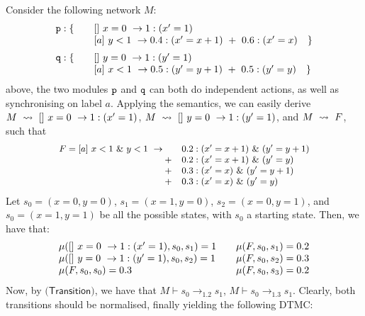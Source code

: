 \begin{example}
  Consider the following network $M$:
  \begin{displaymath}
    \begin{array}{llll}
      \role{p}: \{ & \quad \commandBase {}{x=0} {1:(x'=1)}\\
                   & \quad \commandBase {a}{y<1} {0.4: (x'=x+1)\ +\ 0.6: (x'=x)}\quad \}\\[2mm]
      \role{q}: \{ & \quad \commandBase {}{y=0} {1:(y'=1)}\\
                   & \quad \commandBase {a}{x<1} {0.5: (y'=y+1)\ +\ 0.5: (y'=y)}\quad \}\\
    \end{array}
  \end{displaymath}
  above, the two modules $\mathtt{p}$ and $\mathtt{q}$ can both do
  independent actions, as well as synchronising on label $a$. Applying
  the semantics, we can easily derive
  $M\ \stackrel{}{\rightsquigarrow}\ []\ x=0\ \rightarrow 1:(x'=1)$,
  $M\ \stackrel{}{\rightsquigarrow}\ []\ y=0\ \rightarrow 1:(y'=1)$, and $M\ \stackrel{}{\rightsquigarrow}\ F$,
  such that
  \begin{displaymath}\small
    \begin{array}{rlll}
      F=\commandBase {a}{x<1\ \&\ y<1} {\quad} & 0.2: (x'=x+1)\ \&\ (y'=y+1)\\
                                       + & 0.2: (x'=x+1)\ \&\ (y'=y)\\
                                       + & 0.3: (x'=x)\ \&\ (y'=y+1)\\
                                       + & 0.3: (x'=x)\ \&\ (y'=y)\\
    \end{array}
  \end{displaymath}  
  Let $s_0=(x=0,y=0)$, $s_1=(x=1,y=0)$, $s_2=(x=0,y=1)$, and
  $s_0=(x=1,y=1)$ be all the possible states, with $s_0$ a starting
  state. Then,  we have that: 
  \begin{displaymath}
    \begin{array}{lr}
      \mu([]\ x=0\ \rightarrow 1:(x'=1), s_0, s_1) = 1 & \quad \mu(F, s_0, s_1) = 0.2\\
      \mu([]\ y=0\ \rightarrow 1:(y'=1), s_0, s_2) = 1 & \quad\mu(F, s_0, s_2) = 0.3\\ 
      \mu(F, s_0, s_0) = 0.3 & \quad\mu(F, s_0, s_3) = 0.2\\
    \end{array}
  \end{displaymath}  
  Now, by $\textsf{(Transition)}$, we have that
  $M\vdash s_0\rightarrow_{1.2} s_1$,
  $M\vdash s_0\rightarrow_{1.3} s_1$. Clearly, both transitions should
  be normalised, finally yielding the following DTMC:
\begin{comment}
  \begin{tikzpicture}\small
    \node[state, initial] (1) 
    {\tiny $s_0$};


\end{comment}
\end{example}
